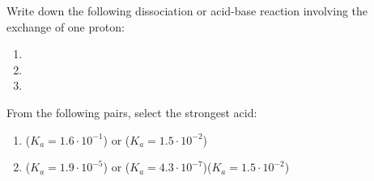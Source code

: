 \documentclass[main.tex]{subfiles}
\begin{document}
\begin{multicols*}{2}
\begin{question}[ID=\the\value{numA}]
Write down the following dissociation or acid-base reaction involving the exchange of one proton:
\begin{enumerate}[label=(\alph*)]
\item  {} %
\item  {} %
\item  {} %
 \end{enumerate}
\end{question}
\begin{solution}
\begin{inparaenum}[(a)]
\item   {} 
\item   {} 
\item   {} 
 \end{inparaenum}
\hspace{0.1cm}\end{solution}%


\begin{question}[ID=\the\value{numA}]
From the following pairs, select the strongest acid:
\begin{enumerate}[label=(\alph*)]
\item  {} ($K_a=1.6\cdot 10^{-1}$) or  ($K_a=1.5\cdot 10^{-2}$) %
\item  {} ($K_a=1.9\cdot 10^{-5}$) or  ($K_a=4.3\cdot 10^{-7}$)($K_a=1.5\cdot 10^{-2}$) %
 \end{enumerate}
\end{question}
\begin{solution}
\begin{inparaenum}[(a)]
 \item    {} 
\item    {}  
 \end{inparaenum}
\hspace{0.1cm}\end{solution}%


\end{multicols*}
\end{document}
